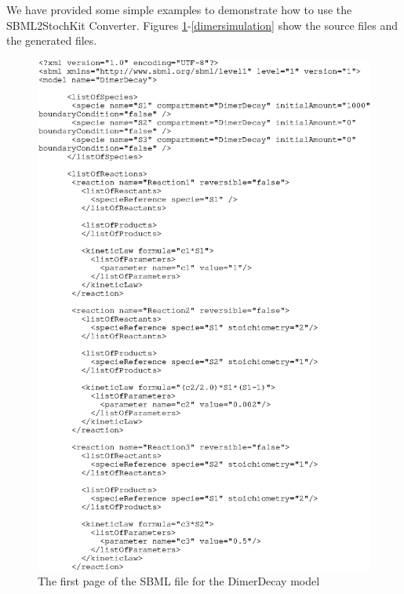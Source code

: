 \documentclass[12pt]{article}
\begin{document}
We have provided some simple examples to demonstrate how to use the SBML2StochKit Converter.
Figures \ref{dimersbml}-\ref{dimersimulation} show the source files and the generated files.



\newpage

\begin{figure}[htbp]
\centering \includegraphics{DimerXml.eps}
\caption{The first page of the SBML file for the DimerDecay model }
\label{dimersbml}
\end{figure}
\end{document}
